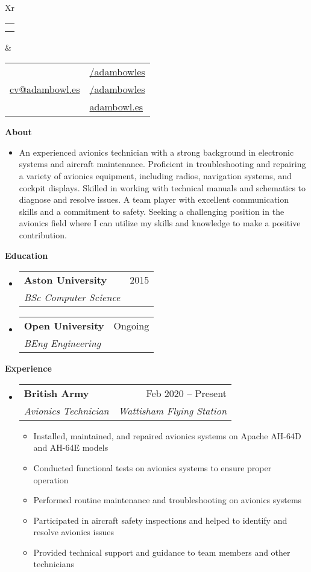 \documentclass[a4paper,12pt]{article}[leftmargin=*]
\makeatletter
\def \fullname {Adam Bowles}
\def \subtitle {}
\def \linkedinicon {\faLinkedin}
\def \linkedinlink {https://linkedin.com/in/adambowles/}
\def \linkedintext {/adambowles}
\def \phoneicon {\faPhone}
\def \phonetext {07584 356713}
\def \emailicon {\faEnvelope}
\def \emaillink {mailto:cv@adambowl.es}
\def \emailtext {cv@adambowl.es}
\def \githubicon {\faGithub}
\def \githublink {https://github.com/adambowles}
\def \githubtext {/adambowles}
\def \websiteicon {\faGlobe}
\def \websitelink {https://adambowl.es/}
\def \websitetext {adambowl.es}
\def \headertype {\doublecol} %
\def \entryspacing {-0pt}
\def \linkedin {\linkedinicon \hspace{3pt}\href{\linkedinlink}{\linkedintext}}
\def \phone {\phoneicon \hspace{3pt}{ \phonetext}}
\def \email {\emailicon \hspace{3pt}\href{\emaillink}{\emailtext}}
\def \github {\githubicon \hspace{3pt}\href{\githublink}{\githubtext}}
\def \website {\websiteicon \hspace{3pt}\href{\websitelink}{\websitetext}}
\renewcommand{\section}[2]{\vspace{5pt}
  \colorbox{secondary}{\color{white}\raggedbottom\normalsize\textbf{{#1}{\hspace{7pt}#2}}}
}
\newcommand{\resumeEntryStart}{\begin{itemize}[leftmargin=2.5mm]}
\newcommand{\resumeEntryEnd}{\end{itemize}\vspace{\entryspacing}}
\newcommand{\resumeItemListStart}{\begin{itemize}[leftmargin=4.5mm]}
\newcommand{\resumeItemListEnd}{\end{itemize}}
\newcommand{\resumeItem}[1]{
  \item\small{
    {#1 \vspace{-2pt}}
  }
}
\newcommand{\resumeEntryBio}[1]{
  \item[]\small{
    {#1}
  }
}
\newcommand{\resumeEntryTSDL}[4]{
  \vspace{-1pt}\item[]
    \begin{tabularx}{0.97\textwidth}{X@{\hspace{60pt}}r}
      \textbf{\color{primary}#1} & {\firabook\color{accent}\small#2} \\
      \textit{\color{accent}\small#3} & \textit{\color{accent}\small#4} \\
    \end{tabularx}\vspace{-6pt}
}
\newcommand{\doublecol}[6]{
  \begin{tabularx}{\textwidth}{Xr}
    {
      \begin{tabular}[c]{l}
        \fontsize{35}{45}\selectfont{\color{primary}{{\textbf{\fullname}}}} \\
        {\textit{\subtitle}} %
      \end{tabular}
    } & {
      \begin{tabular}[c]{l@{\hspace{1.5em}}l}
        {\small#4} & {\small#1} \\
        {\small#5} & {\small#2} \\
        {\small#6} & {\small#3}
      \end{tabular}
    }
  \end{tabularx}
}
\newcommand{\singlecol}[6]{
  \begin{tabularx}{\textwidth}{Xr}
    {
      \begin{tabular}[b]{l}
        \fontsize{35}{45}\selectfont{\color{primary}{{\textbf{\fullname}}}} \\
        {\textit{\subtitle}} %
      \end{tabular}
    } & {
      \begin{tabular}[c]{l}
        {\small#1} \\
        {\small#2} \\
        {\small#3} \\
        {\small#4} \\
        {\small#5} \\
        {\small#6}
      \end{tabular}
    }
  \end{tabularx}
}
\makeatother
\begin{document}


\headertype{\linkedin}{\github}{\website}{\phone}{\email}{} %
\vspace{-10pt} %

\section{\faUser}{About}

  \resumeEntryStart
    \resumeEntryBio{An experienced avionics technician with a strong background in electronic systems and aircraft maintenance. Proficient in troubleshooting and repairing a variety of avionics equipment, including radios, navigation systems, and cockpit displays. Skilled in working with technical manuals and schematics to diagnose and resolve issues. A team player with excellent communication skills and a commitment to safety. Seeking a challenging position in the avionics field where I can utilize my skills and knowledge to make a positive contribution.}
 \resumeEntryEnd

\section{\faGraduationCap}{Education}

  \resumeEntryStart
    \resumeEntryTSDL
      {Aston University}{2015}
      {BSc Computer Science}{}
    \resumeEntryTSDL
      {Open University}{Ongoing}
      {BEng Engineering}{}
  \resumeEntryEnd

\section{\faWrench}{Experience}

  \resumeEntryStart
    \resumeEntryTSDL
      {British Army}{Feb 2020 -- Present}
      {Avionics Technician}{Wattisham Flying Station}
    \resumeItemListStart
      \resumeItem {Installed, maintained, and repaired avionics systems on Apache AH-64D and AH-64E models}
      \resumeItem {Conducted functional tests on avionics systems to ensure proper operation}
      \resumeItem {Performed routine maintenance and troubleshooting on avionics systems}
      \resumeItem {Participated in aircraft safety inspections and helped to identify and resolve avionics issues}
      \resumeItem {Provided technical support and guidance to team members and other technicians}
    \resumeItemListEnd
  \resumeEntryEnd
\end{document}
